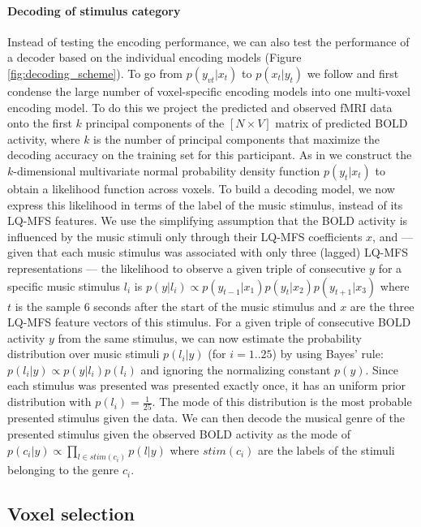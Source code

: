 \paragraph{Decoding of stimulus category}

Instead of testing the encoding performance, we can also test the performance of
a decoder based on the individual encoding models \citet{NG11}
(Figure \ref{fig:decoding_scheme}). To go from
$p(y_{vt}|x_{t})$ to $p(x_{t}|y_{t})$ we follow \citet{NG09} and first condense
the large number of voxel-specific encoding models into one multi-voxel encoding model.
To do this we project the predicted and observed f{MRI} data onto the first $k$
principal components of the $[N\times V]$ matrix of predicted BOLD activity, where $k$ is the number of principal components that maximize the decoding
accuracy on the training set for this participant.
As in \citet{NG09} we construct the $k$-dimensional multivariate normal
probability density function $p(y_{t}|x_{t})$ to obtain a likelihood function across voxels.
To build a decoding model, we now express this likelihood in terms of the label
of the music stimulus, instead of its LQ-MFS features.
We use the simplifying assumption that the BOLD activity is influenced by the music stimuli only through their LQ-MFS
coefficients $x$, and --- given that each music stimulus was associated with only
three (lagged) LQ-MFS representations --- the likelihood to observe a given
triple of consecutive $y$ for a specific music stimulus $l_{i}$ is $p(y|l_{i}) \propto
p(y_{t-1}|x_{1})p(y_{t}|x_{2})p(y_{t+1}|x_{3})$ where $t$ is the sample 6
seconds after the start of the music stimulus and $x$ are the three LQ-MFS
feature vectors of this stimulus.
For a given triple of consecutive BOLD activity $y$ from the same stimulus, we can now estimate the probability distribution over music stimuli
$p(l_{i}|y)$ (for $i=1..25$) by using Bayes' rule: $p(l_{i}|y) \propto
p(y|l_{i})p(l_{i})$ and ignoring the normalizing constant $p(y)$. Since each
stimulus was presented was presented exactly once, it has an uniform prior
distribution with $p(l_{i})=\frac{1}{25}$. The mode of this distribution is the
most probable presented stimulus given the data.
We can then decode the musical genre of the presented stimulus given the observed BOLD activity as the mode of $p(c_{i}|y)
\propto \prod\nolimits_{l \in stim(c_{i})} p(l|y)$ where $stim(c_{i})$ are
the labels of the stimuli belonging to the genre $c_{i}$. 

\subsection*{Voxel selection}

